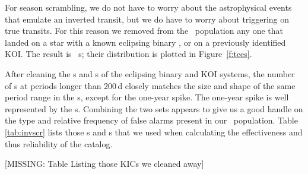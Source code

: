 For season scrambling, we do not have to worry about the astrophysical events that emulate an inverted transit, but we do have to worry about triggering on true transits. For this reason we removed from the \scrtce\ population any one that landed on a star with a known eclipsing binary \citep{Kirk2016}, or on a previously identified KOI.  The result is \nscrtces\ \scrtce s; their distribution is plotted in Figure~\ref{f:tces}. 

After cleaning the \invtce s and \scrtce s of the eclipsing binary and KOI systems, the number of \scrtce s at periods longer than 200\,d closely matches the size and shape of the same period range in the \opstce s, except for the one-year spike.  The one-year spike is well represented by the \invtce s.  Combining the two sets appears to give us a good handle on the type and relative frequency of false alarms present in our \opstce\ population. Table\,\ref{tab:invscr} lists those \invtce s and \scrtce s that we used when calculating the effectiveness and thus reliability of the catalog.


[MISSING: Table Listing those KICs we cleaned away]



